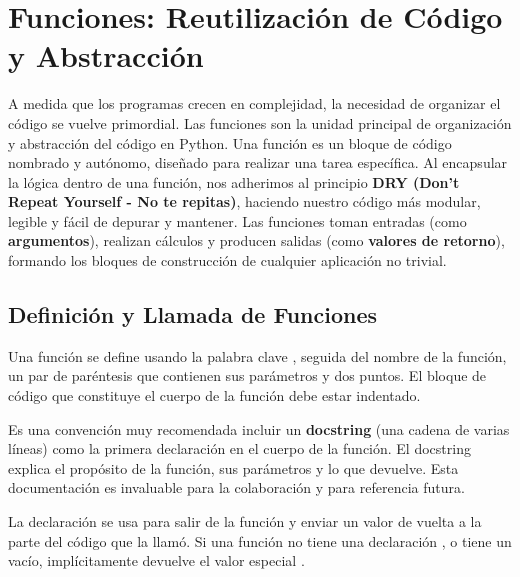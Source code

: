 \section{Funciones: Reutilización de Código y Abstracción}
\label{sec:functions}
A medida que los programas crecen en complejidad, la necesidad de organizar el código se vuelve primordial. Las funciones son la unidad principal de organización y abstracción del código en Python. Una función es un bloque de código nombrado y autónomo, diseñado para realizar una tarea específica. Al encapsular la lógica dentro de una función, nos adherimos al principio \textbf{DRY (Don't Repeat Yourself - No te repitas)}, haciendo nuestro código más modular, legible y fácil de depurar y mantener. Las funciones toman entradas (como \textbf{argumentos}), realizan cálculos y producen salidas (como \textbf{valores de retorno}), formando los bloques de construcción de cualquier aplicación no trivial.

\subsection{Definición y Llamada de Funciones}
\label{subsec:function_definition}
Una función se define usando la palabra clave , seguida del nombre de la función, un par de paréntesis que contienen sus parámetros y dos puntos. El bloque de código que constituye el cuerpo de la función debe estar indentado.

Es una convención muy recomendada incluir un \textbf{docstring} (una cadena de varias líneas) como la primera declaración en el cuerpo de la función. El docstring explica el propósito de la función, sus parámetros y lo que devuelve. Esta documentación es invaluable para la colaboración y para referencia futura.

La declaración  se usa para salir de la función y enviar un valor de vuelta a la parte del código que la llamó. Si una función no tiene una declaración , o tiene un  vacío, implícitamente devuelve el valor especial .

